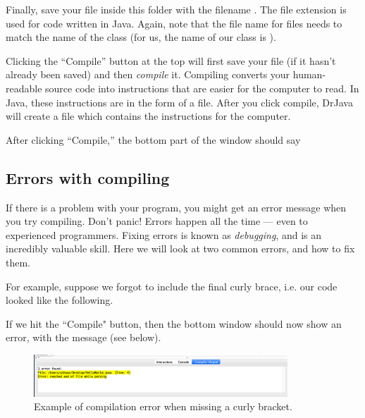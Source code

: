 Finally, save your file inside this folder with the filename . The  file extension is used for code written in Java. 
Again, note that the file name for  files needs to match the name of the class (for us, the name of our class is ).

Clicking the ``Compile'' button at the top will first save your file (if it hasn't already been saved) and then \emph{compile} it. Compiling converts your human-readable
source code into instructions that are easier for the computer to read. In Java, these instructions are in the form of a  file. After you click compile, DrJava will create a
 file which contains the instructions for the computer.


After clicking ``Compile,'' the bottom part of the window should say

\subsection{Errors with compiling}

If there is a problem with your program, you might get an error message when you try compiling. Don't panic! Errors happen all the time --- even to experienced programmers. Fixing errors is known as \emph{debugging}, and is an incredibly valuable skill. Here we will look at two common errors, and how to fix them. 

For example, suppose we forgot to include the final curly brace, i.e. our code looked like the following.

\begin{code}
class HelloWorld {
    
    public static void main(String[] args) {
        System.out.println("Hello World!");
    }
\end{code}

If we hit the  ``Compile" button, then the bottom window should now show an error, with the message  (see below).

\begin{figure}[ht]
	\centering
	\includegraphics[width=0.85\textwidth]{images/hello_world_error.png}
	\caption{Example of compilation error when missing a curly bracket.}
	\label{fig:helloworld:sec:error}
\end{figure}


